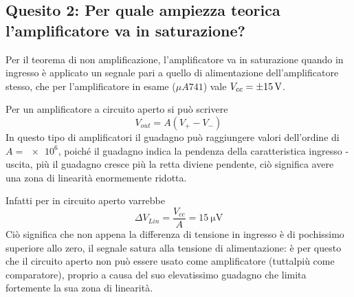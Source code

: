 \documentclass[a4paper, 12pt, twoside]{report}
\begin{document}
\newpage

\subsection{Quesito 2: Per quale ampiezza teorica l'amplificatore va in saturazione?}

Per il teorema di non amplificazione, l'amplificatore va in saturazione quando in ingresso è applicato un segnale pari a quello di alimentazione dell'amplificatore stesso, che per l'amplificatore in esame ($\mu A741$) vale $V_{cc}=\SI{\pm15}{\volt}$. \newline

Per un amplificatore a circuito aperto si può scrivere
\[V_{out} = A(V_+-V_-)\]
In questo tipo di amplificatori il guadagno può raggiungere valori dell'ordine di $A = \num{e6}$, poiché il guadagno indica la pendenza della caratteristica ingresso - uscita, più il guadagno cresce più la retta diviene pendente, ciò significa avere una zona di linearità enormemente ridotta.
\begin{figure}[H]
	\centering
	 \quad {}
\end{figure}
Infatti per in circuito aperto varrebbe 
\[\Delta V_{Lin} = \dfrac{V_{cc}}{A} = \SI{15}{\micro\volt}\] 
Ciò significa che non appena la differenza di tensione in ingresso è di pochissimo superiore allo zero, il segnale satura alla tensione di alimentazione: è per questo che il circuito aperto non può essere usato come amplificatore (tuttalpiù come comparatore), proprio a causa del suo elevatissimo guadagno che limita fortemente la sua zona di linearità. 
\end{document}
